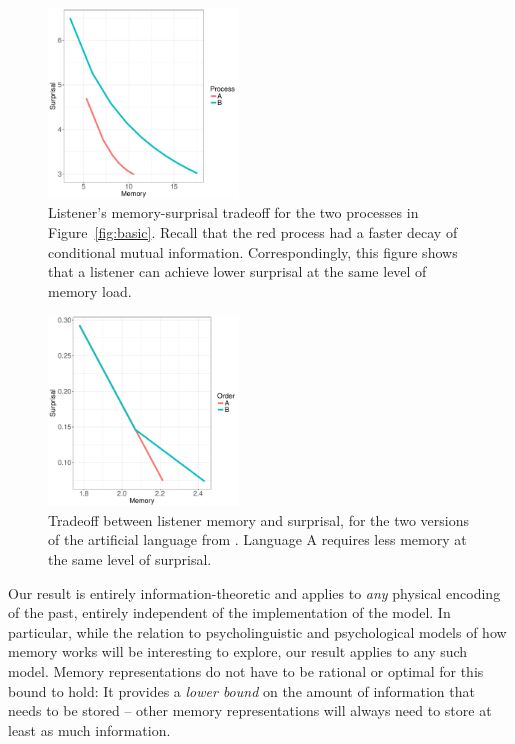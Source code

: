 \documentclass[11pt,letterpaper]{article}
\begin{document}
\begin{figure}
\includegraphics[width=0.45\textwidth]{toy/listener-tradeoff.pdf}
	\caption{Listener's memory-surprisal tradeoff for the two processes in Figure~\ref{fig:basic}. Recall that the red process had a faster decay of conditional mutual information. Correspondingly, this figure shows that a listener can achieve lower surprisal at the same level of memory load.}\label{fig:listener-tradeoff}
\end{figure}



\begin{figure}
\includegraphics[width=0.45\textwidth]{toy/toy-mem-surp.pdf}
	\caption{Tradeoff between listener memory and surprisal, for the two versions of the artificial language from \cite{fedzechkina-human-2017}. Language A requires less memory at the same level of surprisal.}\label{fig:toy-listener-tradeoff}
\end{figure}










Our result is entirely information-theoretic and applies to \emph{any} physical encoding of the past, entirely independent of the implementation of the model. %
In particular, while the relation to psycholinguistic and psychological models of how memory works will be interesting to explore, our result applies to any such model.
Memory representations do not have to be rational or optimal for this bound to hold:
It provides a \emph{lower bound} on the amount of information that needs to be stored -- other memory representations will always need to store at least as much information.
\end{document}
